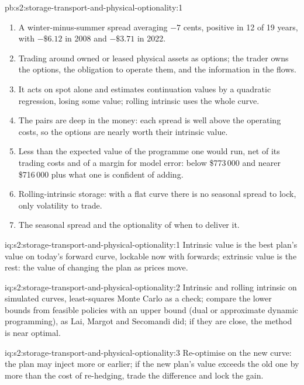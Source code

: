 \begin{solution}{pb:s2:storage-transport-and-physical-optionality:1}
\begin{enumerate}
\item A winter-minus-summer spread averaging $-7$ cents, positive in 12 of 19 years, with $-\$6.12$ in 2008 and $-\$3.71$ in 2022.
\item Trading around owned or leased physical assets as options; the trader owns the options, the obligation to operate them, and the information
in the flows.
\item It acts on spot alone and estimates continuation values by a quadratic regression, losing some value; rolling intrinsic uses the whole curve.
\item The pairs are deep in the money: each spread is well above the operating costs, so the options are nearly worth their intrinsic value.
\item Less than the expected value of the programme one would run, net of its trading costs and of a margin for model error: below \$773\,000
and nearer \$716\,000 plus what one is confident of adding.
\item Rolling-intrinsic storage: with a flat curve there is no seasonal spread to lock, only volatility to trade.
\item The seasonal spread and the optionality of when to deliver it.
\end{enumerate}
\end{solution}

\begin{solution}{iq:s2:storage-transport-and-physical-optionality:1}
Intrinsic value is the best plan's value on today's forward curve, lockable now with forwards; extrinsic value is the rest: the value of changing the
plan as prices move.
\end{solution}

\begin{solution}{iq:s2:storage-transport-and-physical-optionality:2}
Intrinsic and rolling intrinsic on simulated curves, least-squares Monte Carlo as a check; compare the lower bounds from feasible policies with an
upper bound (dual or approximate dynamic programming), as Lai, Margot and Secomandi did; if they are close, the method is near optimal.
\end{solution}

\begin{solution}{iq:s2:storage-transport-and-physical-optionality:3}
Re-optimise on the new curve: the plan may inject more or earlier; if the new plan's value exceeds the old one by more than the cost of re-hedging,
trade the difference and lock the gain.
\end{solution}

